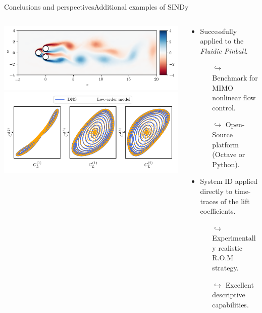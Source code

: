 \documentclass[usenames,dvipsnames,svgnames,10pt,aspectratio=169]{beamer}
\begin{document}
\begin{frame}[t, c]{Conclusions and perspectives}{Additional examples of SINDy}
	\begin{columns}
		\begin{column}{.5\textwidth}
			\centering
			\includegraphics[width=.9\columnwidth]{snapshots_re120} \\
			\medskip
			\includegraphics[width=.9\columnwidth]{phase_space_RE60}
		\end{column}
		\begin{column}{.5\textwidth}
			\begin{itemize}
				\item Successfully applied to the \emph{Fluidic Pinball}.
				\begin{itemize}
					\item[$\hookrightarrow$] Benchmark for MIMO nonlinear flow control.
					\item[$\hookrightarrow$] Open-Source platform (Octave or Python).
				\end{itemize}

				\vspace{1.5cm}

				\item System ID applied directly to time-traces of the lift coefficients.
				\begin{itemize}
					\item[$\hookrightarrow$] Experimentally realistic R.O.M strategy.
					\item[$\hookrightarrow$] Excellent descriptive capabilities.
				\end{itemize}
			\end{itemize}

			\vspace{1cm}
		\end{column}
	\end{columns}
\end{frame}
\end{document}
